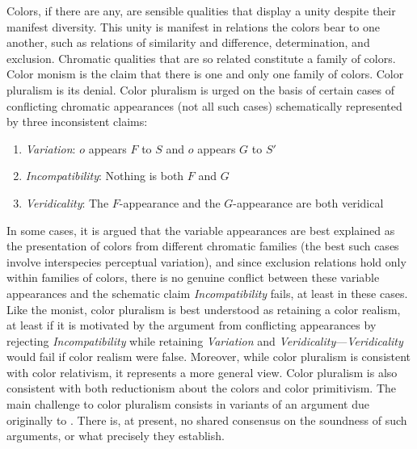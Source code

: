 \documentclass[12pt]{article}
\begin{document}
Colors, if there are any, are sensible qualities that display a unity despite their manifest diversity. This unity is manifest in relations the colors bear to one another, such as relations of similarity and difference, determination, and exclusion. Chromatic qualities that are so related constitute a family of colors. Color monism is the claim that there is one and only one family of colors. Color pluralism is its denial. Color pluralism is urged on the basis of certain cases of conflicting chromatic appearances (not all such cases) schematically represented by three inconsistent claims: 
\begin{enumerate}
	\item \emph{Variation}: \( o \) appears \( F \) to \( S \) and \( o \) appears \( G \) to \( S' \)
	\item \emph{Incompatibility}: Nothing is both \( F \) and \( G \)
	\item \emph{Veridicality}: The \( F \)-appearance and the \( G \)-appearance are both veridical
\end{enumerate}
In some cases, it is argued that the variable appearances are best explained as the presentation of colors from different chromatic families (the best such cases involve interspecies perceptual variation), and since exclusion relations hold only within families of colors, there is no genuine conflict between these variable appearances and the schematic claim \emph{Incompatibility} fails, at least in these cases. Like the monist, color pluralism is best understood as retaining a color realism, at least if it is motivated by the argument from conflicting appearances by rejecting \emph{Incompatibility} while retaining \emph{Variation} and \emph{Veridicality}---\emph{Veridicality} would fail if color realism were false. Moreover, while color pluralism is consistent with color relativism, it represents a more general view. Color pluralism is also consistent with both reductionism about the colors and color primitivism. The main challenge to color pluralism consists in variants of an argument due originally to \citet{Shoemaker:2003wk}. There is, at present, no shared consensus on the soundness of such arguments, or what precisely they establish.



\nocite{Cooper:1997fk}
\nocite{Hett:1936fk}
\nocite{Heraclitus:1979uq}

 
 
\end{document}
